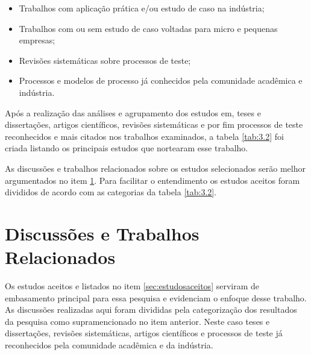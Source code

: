 \begin{itemize}
\item Trabalhos com aplicação prática e/ou estudo de caso na indústria;
\item Trabalhos com ou sem estudo de caso voltadas para micro e pequenas empresas;
\item Revisões sistemáticas sobre processos de teste;
\item Processos  e  modelos  de  processo  já  conhecidos  pela  comunidade  acadêmica  e
indústria.
\end{itemize}

Após a realização das análises e agrupamento dos estudos em, teses e dissertações, artigos científicos, revisões sistemáticas e por fim processos de teste reconhecidos e mais citados nos trabalhos examinados, a tabela \ref{tab:3.2} foi criada listando os principais estudos que nortearam esse trabalho.

\begin{table}[ht]
\centering
\caption{Quantitativo dos principais trabalhos aceitos para essa pesquisa.}
\label{tab:3.2}
\end{table}

As discussões e trabalhos relacionados sobre os estudos selecionados serão melhor argumentados no item \ref{sec:discussoes}. Para facilitar o entendimento os estudos aceitos foram divididos de acordo com as categorias da tabela \ref{tab:3.2}.

\section{Discussões e Trabalhos Relacionados}
\label{sec:discussoes}

Os estudos aceitos e listados no item \ref{sec:estudosaceitos} serviram de embasamento principal para essa pesquisa e evidenciam o enfoque desse trabalho. As discussões realizadas aqui foram divididas pela categorização dos resultados da pesquisa como supramencionado no item anterior. Neste caso teses e dissertações, revisões sistemáticas, artigos científicos e processos de teste já reconhecidos pela comunidade acadêmica e da indústria.

